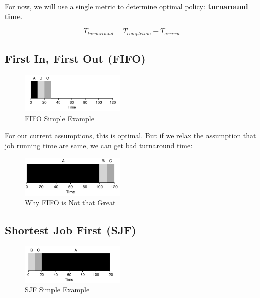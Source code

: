 For now, we will use a single metric to determine optimal policy:
\textbf{turnaround time}.

$$
T_{turnaround} = T_{completion} - T_{arrival}
$$

\subsection{First In, First Out (FIFO)}

\begin{figure}[h!]
    \begin{center}
        \includegraphics[width=5cm]{img/71.png}
        \caption{FIFO Simple Example}
    \end{center}
\end{figure}

For our current assumptions, this is optimal. But if we relax the assumption
that job running time are same, we can get bad turnaround time:

\begin{figure}[h!]
    \begin{center}
        \includegraphics[width=5cm]{img/72.png}
        \caption{Why FIFO is Not that Great}
    \end{center}
\end{figure}

\subsection{Shortest Job First (SJF)}

\begin{figure}[h!]
    \begin{center}
        \includegraphics[width=5cm]{img/73.png}
        \caption{SJF Simple Example}
    \end{center}
\end{figure}

